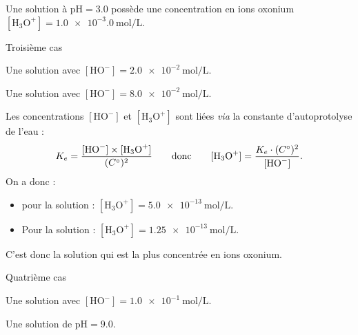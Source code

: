 \reponse{\reponseA}

\begin{corrige}
Une solution à $\text{pH}=\num{3,0}$ possède une concentration en ions oxonium $[\mathrm{H_3O^+}] = \SI{1.0e-3,0}{\mole\per\liter}$.
\end{corrige}




\begin{enonce}
Troisième cas
\begin{listeQCM1Colonne}
	\item Une solution avec $[\mathrm{HO^-}]=\SI{2,0e-2}{\mole\per\liter}$.
	\item Une solution avec $[\mathrm{HO^-}]=\SI{8,0e-2}{\mole\per\liter}$.
\end{listeQCM1Colonne}
\medskip
\end{enonce}
\reponse{\reponseA}

\begin{corrige}
Les concentrations $[\text{HO}^-]$ et $[\text{H}_3\text{O}^+]$ sont liées \emph{via} la  constante d'autoprotolyse de l'eau : \vspace{-2mm}
\[
K_e=\frac{[\text{HO}^-]\times[\text{H}_3\text{O}^+]}{(C^\circ)^2}
\qquad\text{donc}\qquad
[\text{H}_3\text{O}^+]=\frac{K_e\cdot (C^\circ)^2}{[\text{HO}^-]}. \vspace{-3mm}
\]
On a donc :
\begin{itemize}
\item
pour la solution \reponseA :  $[\mathrm{H_3O^+}]=\SI{5,0e-13}{\mole\per\liter}$.
\item
Pour la solution \reponseB : $[\mathrm{H_3O^+}]=\SI{1.25e-13}{\mole\per\liter}$.
\end{itemize}
C'est donc la solution \reponseA{} qui est la plus concentrée en ions oxonium.
\end{corrige}




\begin{enonce}
Quatrième cas
\begin{listeQCM1Colonne}
	\item Une solution avec $[\mathrm{HO^-}]=\SI{1,0e-1}{\mole\per\liter}$.
	\item Une solution de $\text{pH}=\num{9.0}$.
\end{listeQCM1Colonne}
\medskip
\end{enonce}

